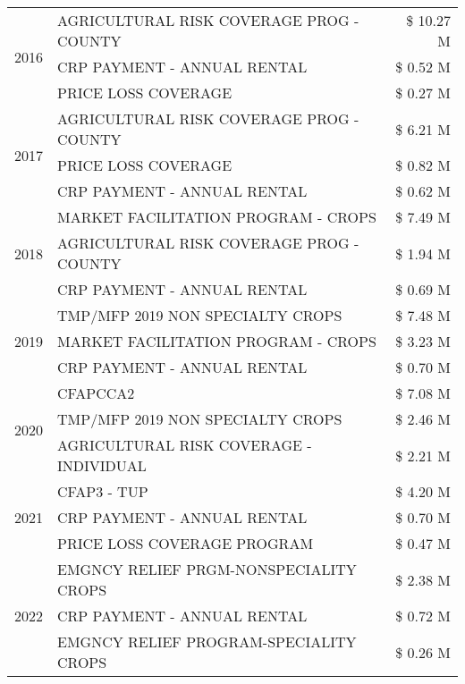 \begin{tabular}{llr}
\cline{1-3}
\multirow[t]{3}{*}{2016} & AGRICULTURAL RISK COVERAGE PROG - COUNTY & \$ 10.27 M \\
 & CRP PAYMENT - ANNUAL RENTAL & \$ 0.52 M \\
 & PRICE LOSS COVERAGE & \$ 0.27 M \\
\cline{1-3}
\multirow[t]{3}{*}{2017} & AGRICULTURAL RISK COVERAGE PROG - COUNTY & \$ 6.21 M \\
 & PRICE LOSS COVERAGE & \$ 0.82 M \\
 & CRP PAYMENT - ANNUAL RENTAL & \$ 0.62 M \\
\cline{1-3}
\multirow[t]{3}{*}{2018} & MARKET FACILITATION PROGRAM - CROPS & \$ 7.49 M \\
 & AGRICULTURAL RISK COVERAGE PROG - COUNTY & \$ 1.94 M \\
 & CRP PAYMENT - ANNUAL RENTAL & \$ 0.69 M \\
\cline{1-3}
\multirow[t]{3}{*}{2019} & TMP/MFP 2019 NON SPECIALTY CROPS & \$ 7.48 M \\
 & MARKET FACILITATION PROGRAM - CROPS & \$ 3.23 M \\
 & CRP PAYMENT - ANNUAL RENTAL & \$ 0.70 M \\
\cline{1-3}
\multirow[t]{3}{*}{2020} & CFAPCCA2 & \$ 7.08 M \\
 & TMP/MFP 2019 NON SPECIALTY CROPS & \$ 2.46 M \\
 & AGRICULTURAL RISK COVERAGE - INDIVIDUAL & \$ 2.21 M \\
\cline{1-3}
\multirow[t]{3}{*}{2021} & CFAP3 - TUP & \$ 4.20 M \\
 & CRP PAYMENT - ANNUAL RENTAL & \$ 0.70 M \\
 & PRICE LOSS COVERAGE PROGRAM & \$ 0.47 M \\
\cline{1-3}
\multirow[t]{3}{*}{2022} & EMGNCY RELIEF PRGM-NONSPECIALITY CROPS & \$ 2.38 M \\
 & CRP PAYMENT - ANNUAL RENTAL & \$ 0.72 M \\
 & EMGNCY RELIEF PROGRAM-SPECIALITY CROPS & \$ 0.26 M \\
\cline{1-3}
\bottomrule
\end{tabular}
